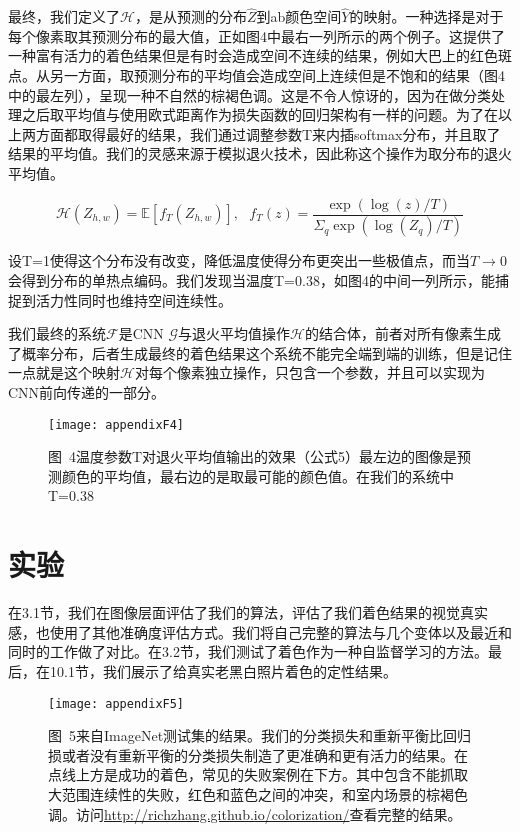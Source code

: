 最终，我们定义了$\mathcal{H}$，是从预测的分布$\hat{Z}$到ab颜色空间$\hat{Y}$的映射。一种选择是对于每个像素取其预测分布的最大值，正如图4中最右一列所示的两个例子。这提供了一种富有活力的着色结果但是有时会造成空间不连续的结果，例如大巴上的红色斑点。从另一方面，取预测分布的平均值会造成空间上连续但是不饱和的结果（图4中的最左列），呈现一种不自然的棕褐色调。这是不令人惊讶的，因为在做分类处理之后取平均值与使用欧式距离作为损失函数的回归架构有一样的问题。为了在以上两方面都取得最好的结果，我们通过调整参数T来内插softmax分布，并且取了结果的平均值。我们的灵感来源于模拟退火技术，因此称这个操作为取分布的退火平均值。

\begin{equation}\tag*{(5)}
\mathcal{H}(Z_{h,w}) = \mathbb{E}[f_T(Z_{h,w})], \text{ } f_T(z) = \frac{\exp(\log(z)/T)}{\Sigma_q\exp(\log(Z_q)/T)}
\end{equation}

设T=1使得这个分布没有改变，降低温度使得分布更突出一些极值点，而当$T \rightarrow 0$会得到分布的单热点编码。我们发现当温度T=0.38，如图4的中间一列所示，能捕捉到活力性同时也维持空间连续性。

我们最终的系统$\mathcal{F}$是CNN $\mathcal{G}$与退火平均值操作$\mathcal{H}$的结合体，前者对所有像素生成了概率分布，后者生成最终的着色结果这个系统不能完全端到端的训练，但是记住一点就是这个映射$\mathcal{H}$对每个像素独立操作，只包含一个参数，并且可以实现为CNN前向传递的一部分。

\begin{figure}[h]
  \centering
  \texttt{[image: appendixF4]}
  \caption*{图~4\quad 温度参数T对退火平均值输出的效果（公式5）最左边的图像是预测颜色的平均值，最右边的是取最可能的颜色值。在我们的系统中T=0.38}
  \label{tab:badfigure4}
\end{figure}

\section{实验}

在3.1节，我们在图像层面评估了我们的算法，评估了我们着色结果的视觉真实感，也使用了其他准确度评估方式。我们将自己完整的算法与几个变体以及最近和同时的工作做了对比。在3.2节，我们测试了着色作为一种自监督学习的方法。最后，在10.1节，我们展示了给真实老黑白照片着色的定性结果。

\begin{figure}[!htb]
  \centering
  \texttt{[image: appendixF5]}
  \caption*{图~5\quad 来自ImageNet测试集的结果。我们的分类损失和重新平衡比回归损或者没有重新平衡的分类损失制造了更准确和更有活力的结果。在点线上方是成功的着色，常见的失败案例在下方。其中包含不能抓取大范围连续性的失败，红色和蓝色之间的冲突，和室内场景的棕褐色调。访问\url{http://richzhang.github.io/colorization/}查看完整的结果。}
  \label{tab:badfigure5}
\end{figure}

